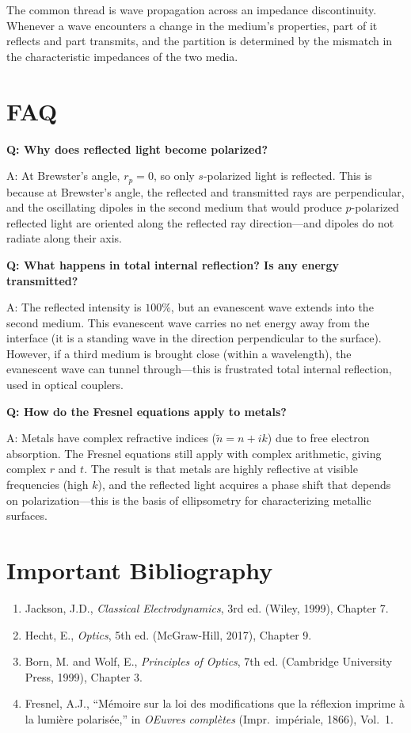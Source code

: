 \documentclass[11pt,openright]{book}
\begin{document}
The common thread is wave propagation across an impedance discontinuity. Whenever a wave encounters a change in the medium's properties, part of it reflects and part transmits, and the partition is determined by the mismatch in the characteristic impedances of the two media.

\section*{FAQ}

\textbf{Q: Why does reflected light become polarized?}

A: At Brewster's angle, $r_p = 0$, so only $s$-polarized light is reflected. This is because at Brewster's angle, the reflected and transmitted rays are perpendicular, and the oscillating dipoles in the second medium that would produce $p$-polarized reflected light are oriented along the reflected ray direction---and dipoles do not radiate along their axis.

\textbf{Q: What happens in total internal reflection? Is any energy transmitted?}

A: The reflected intensity is $100\%$, but an evanescent wave extends into the second medium. This evanescent wave carries no net energy away from the interface (it is a standing wave in the direction perpendicular to the surface). However, if a third medium is brought close (within a wavelength), the evanescent wave can tunnel through---this is frustrated total internal reflection, used in optical couplers.

\textbf{Q: How do the Fresnel equations apply to metals?}

A: Metals have complex refractive indices ($\tilde{n} = n + ik$) due to free electron absorption. The Fresnel equations still apply with complex arithmetic, giving complex $r$ and $t$. The result is that metals are highly reflective at visible frequencies (high $k$), and the reflected light acquires a phase shift that depends on polarization---this is the basis of ellipsometry for characterizing metallic surfaces.
\section*{Important Bibliography}

\begin{enumerate}
\item Jackson, J.D., \textit{Classical Electrodynamics}, 3rd ed. (Wiley, 1999), Chapter 7.
\item Hecht, E., \textit{Optics}, 5th ed. (McGraw-Hill, 2017), Chapter 9.
\item Born, M. and Wolf, E., \textit{Principles of Optics}, 7th ed. (Cambridge University Press, 1999), Chapter 3.
\item Fresnel, A.J., ``M\'emoire sur la loi des modifications que la r\'eflexion imprime \`a la lumi\`ere polaris\'ee,'' in \textit{ OEuvres compl\`etes} (Impr.\ imp\'eriale, 1866), Vol.\ 1.
\end{enumerate}
\end{document}
